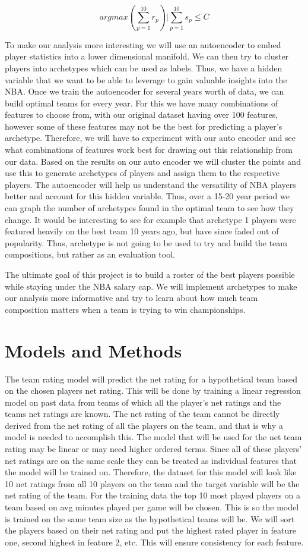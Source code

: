 \documentclass[12pt, letterpaper, titlepage]{article}
\begin{document}
\[argmax(\sum_{p=1}^{10} r_p) | \sum_{p=1}^{10}s_p \leq C\]

To make our analysis more interesting we will use an autoencoder to embed player statistics into a lower dimensional manifold. We can then try to cluster players into archetypes which can be used as labels. Thus, we have a hidden variable that we want to be able to leverage to gain valuable insights into the NBA. Once we train the autoencoder for several years worth of data, we can build optimal teams for every year.  For this we have many combinations of features to choose from, with our original dataset having over 100 features, however some of these features may not be the best for predicting a player’s archetype. Therefore, we will have to experiment with our auto encoder and see what combinations of features work best for drawing out this relationship from our data. Based on the results on our auto encoder we will cluster the points and use this to generate archetypes of players and assign them to the respective players. The autoencoder will help us understand the versatility of NBA players better and account for this hidden variable. Thus, over a 15-20 year period we can graph the number of archetypes found in the optimal team to see how they change. It would be interesting to see for example that archetype 1 players were featured heavily on the best team 10 years ago, but have since faded out of popularity. Thus, archetype is not going to be used to try and build the team compositions, but rather as an evaluation tool.

The ultimate goal of this project is to build a roster of the best players possible while staying under the NBA salary cap. We will implement archetypes to make our analysis more informative and try to learn about how much team composition matters when a team is trying to win championships.

\section{Models and Methods}
The team rating model will predict the net rating for a hypothetical team based on the chosen players net rating. This will be done by training a linear regression model on past data from teams of which all the player’s net ratings and the teams net ratings are known. The net rating of the team cannot be directly derived from the net rating of all the players on the team, and that is why a model is needed to accomplish this. The model that will be used for the net team rating may be linear or may need higher ordered terms. Since all of these players’ net ratings are on the same scale they can be treated as individual features that the model will be trained on. Therefore, the dataset for this model will look like 10 net ratings from all 10 players on the team and the target variable will be the net rating of the team. For the training data the top 10 most played players on a team based on avg minutes played per game will be chosen. This is so the model is trained on the same team size as the hypothetical teams will be. We will sort the players based on their net rating and put the highest rated player in feature one, second highest in feature 2, etc. This will ensure consistency for each feature.
\end{document}
